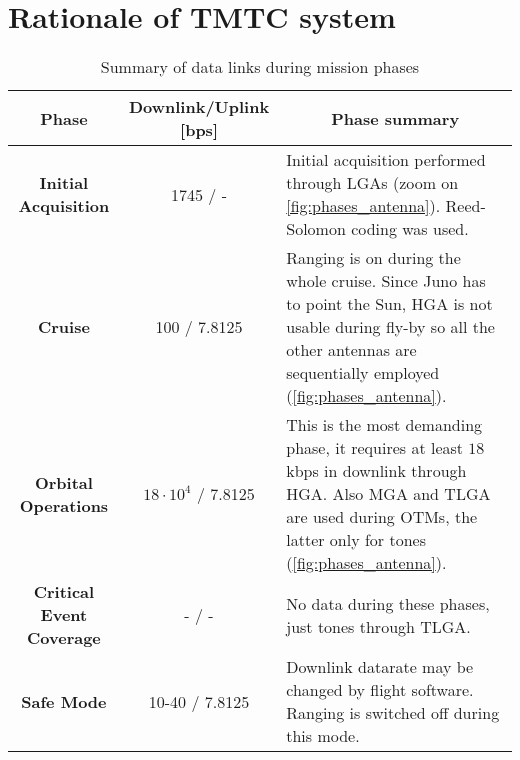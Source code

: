 \section{Rationale of TMTC system}
\label{sec:TMTC_rationale}

% 


\begin{table}[H]
    \renewcommand{\arraystretch}{1.7}
    \centering
    \begin{tabularx}{\linewidth}{|c|c|X|}
        \hline
        \textbf{Phase} & \textbf{Downlink/Uplink [bps]} &  \multicolumn{1}{|c|}{\textbf{Phase summary}}  \\
        \hline
        \hline
        \textbf{Initial Acquisition} & 1745 / - & 
        Initial acquisition performed through LGAs \newline (zoom on \autoref{fig:phases_antenna}). Reed-Solomon coding was used. \\ 
        \hline
        \textbf{Cruise} & 100 / 7.8125 & 
        Ranging is on during the whole cruise. Since Juno has to point the Sun, HGA is not usable during fly-by so all the other antennas are sequentially employed (\autoref{fig:phases_antenna}). \\
        \hline
        \textbf{Orbital Operations} & $18 \cdot 10^{4} $ / 7.8125 & 
        This is the most demanding phase, it requires at least $18$ kbps in downlink through HGA. Also MGA and TLGA are used during OTMs, the latter only for tones (\autoref{fig:phases_antenna}). \\
        \hline
        \textbf{Critical Event Coverage} & - / - & No data during these phases, just tones through TLGA.\\
        \hline
        \textbf{Safe Mode} & 10-40 / 7.8125 &
        Downlink datarate may be changed by flight software. Ranging is switched off during this mode. \\
        \hline
    \end{tabularx}
    \caption{Summary of data links during mission phases \cite{juno_telecommunication}}
    \label{table:link_phases}
\end{table}
